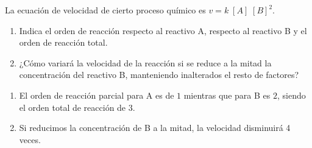 \begin{exerciseEVAU}
    La ecuación de velocidad de cierto proceso químico es $v = k\; [A]\; [B]^2$.
    \begin{enumerate}[label=\letraminuscula]
        \item Indica el orden de reacción respecto al reactivo A, respecto al reactivo B y el orden de reacción total.
        \item ¿Cómo variará la velocidad de la reacción si se reduce a la mitad la concentración del reactivo B, manteniendo inalterados el resto de factores?
    \end{enumerate}

    \begin{solu}
        \begin{enumerate}[label=\letraminuscula]
            \item El orden de reacción parcial para A es de $1$ mientras que para B es $2$, siendo el orden total de reacción de $3$.
            \item Si reducimos la concentración de B a la mitad, la velocidad disminuirá 4 veces.
        \end{enumerate}

    \end{solu}
\end{exerciseEVAU}

\newpage


%

%

%

